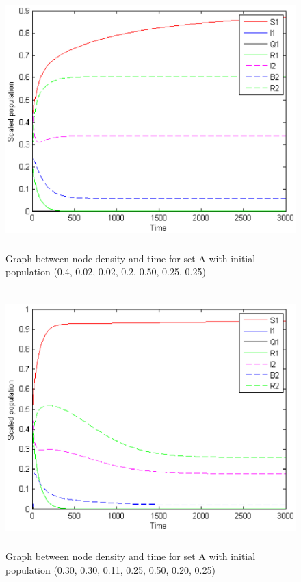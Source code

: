 \begin{figure}
\centerline{\includegraphics[width=15cm,height=10cm]{13-DR2}}
\caption{Graph between node density and time for set A with initial population (0.4, 0.02, 0.02, 0.2, 0.50, 0.25, 0.25)}
\label{fig:13-DR2}
\end{figure}
\begin{figure}
\centerline{\includegraphics[width=15cm,height=10cm]{13-DR3}}
\caption{Graph between node density and time for set A with initial population (0.30, 0.30, 0.11, 0.25, 0.50, 0.20, 0.25)}
\label{fig:13-DR3}
\end{figure}
